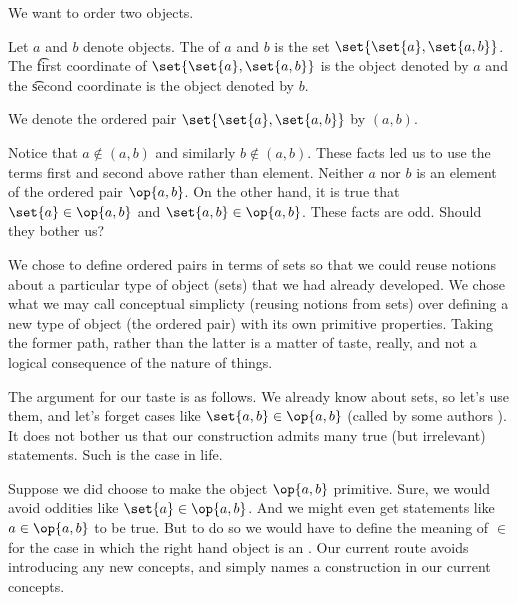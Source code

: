 

We want to order two objects.


Let $a$ and $b$ denote objects.
The  of $a$ and $b$ is the set $\set{\set{a}, \set{a, b}}$.
The \t{first coordinate} of $\set{\set{a}, \set{a, b}}$ is the object denoted by $a$ and the \t{second coordinate} is the object denoted by $b$.



We denote the ordered pair $\set{\set{a},\set{a,b}}$ by $(a, b)$.


Notice that $a \not\in (a, b)$ and similarly $b \not\in (a, b)$.
These facts led us to use the terms first and second  above rather than element.
Neither $a$ nor $b$ is an element of the ordered pair $\op{a, b}$.
On the other hand, it is true that $\set{a} \in \op{a, b}$ and $\set{a, b} \in \op{a, b}$.
These facts are odd.
Should they bother us?

We chose to define ordered pairs in terms of sets so that we could reuse notions about a particular type of object (sets) that we had already developed.
We chose what we may call conceptual simplicty (reusing notions from sets) over defining a new type of object (the ordered pair) with its own primitive properties.
Taking the former path, rather than the latter is a matter of taste, really, and not a logical consequence of the nature of things.

The argument for our taste is as follows.
We already know about sets, so let's use them, and let's forget cases like $\set{a, b} \in \op{a, b}$ (called by some authors ).
It does not bother us that our construction admits many true (but irrelevant) statements.
Such is the case in life.

Suppose we did choose to make the object $\op{a, b}$ primitive.
Sure, we would avoid oddities like $\set{a} \in \op{a, b}$.
And we might even get statements like $a \in \op{a, b}$ to be true.
But to do so we would have to define the meaning of $\in$ for the case in which the right hand object is an .
Our current route avoids introducing any new concepts, and simply names a construction in our current concepts.
